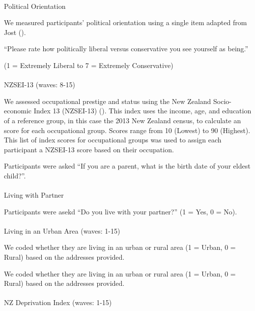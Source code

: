 \documentclass[
  singlecolumn,
  9pt]{article}
\makeatletter
\let\oldparagraph\paragraph
\renewcommand{\paragraph}{
    \@ifstar
      \xxxParagraphStar
      \xxxParagraphNoStar
  }
\newcommand{\xxxParagraphStar}[1]{\oldparagraph*{#1}\mbox{}}
\newcommand{\xxxParagraphNoStar}[1]{\oldparagraph{#1}\mbox{}}
\makeatother
\begin{document}
\paragraph{Political Orientation}\label{political-orientation}

We measured participants' political orientation using a single item
adapted from Jost ().

``Please rate how politically liberal versus conservative you see
yourself as being.''

(1 = Extremely Liberal to 7 = Extremely Conservative)

\paragraph{NZSEI-13 (waves: 8-15)}\label{nzsei-13-waves-8-15}

We assessed occupational prestige and status using the New Zealand
Socio-economic Index 13 (NZSEI-13) (). This index uses the income, age, and education of
a reference group, in this case the 2013 New Zealand census, to
calculate an score for each occupational group. Scores range from 10
(Lowest) to 90 (Highest). This list of index scores for occupational
groups was used to assign each participant a NZSEI-13 score based on
their occupation.

Participants were asked ``If you are a parent, what is the birth date of
your eldest child?''.

\paragraph{Living with Partner}\label{living-with-partner}

Participants were asekd ``Do you live with your partner?'' (1 = Yes, 0 =
No).

\paragraph{Living in an Urban Area (waves:
1-15)}\label{living-in-an-urban-area-waves-1-15}

We coded whether they are living in an urban or rural area (1 = Urban, 0
= Rural) based on the addresses provided.

We coded whether they are living in an urban or rural area (1 = Urban, 0
= Rural) based on the addresses provided.

\paragraph{NZ Deprivation Index (waves:
1-15)}\label{nz-deprivation-index-waves-1-15}
\end{document}
